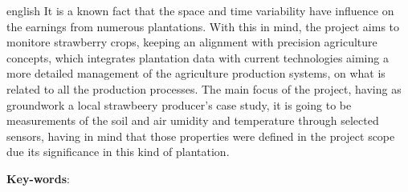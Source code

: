 \begin{resumo}[Abstract]
 \begin{otherlanguage*}{english}
It is a known fact that the space and time variability have influence on the earnings from numerous plantations.
With this in mind, the project aims to monitore strawberry crops, keeping an alignment with precision agriculture concepts,
which integrates plantation data with current technologies aiming a more detailed management of the agriculture production
systems, on what is related to all the production processes.
The main focus of the project, having as groundwork a local strawbeery producer's case study, it is going to be measurements
of the soil and air umidity and temperature through selected sensors, having in mind that those properties were defined in
the project scope due its significance in this kind of plantation.
   \vspace{\onelineskip}

   \noindent
   \textbf{Key-words}:
 \end{otherlanguage*}
\end{resumo}
